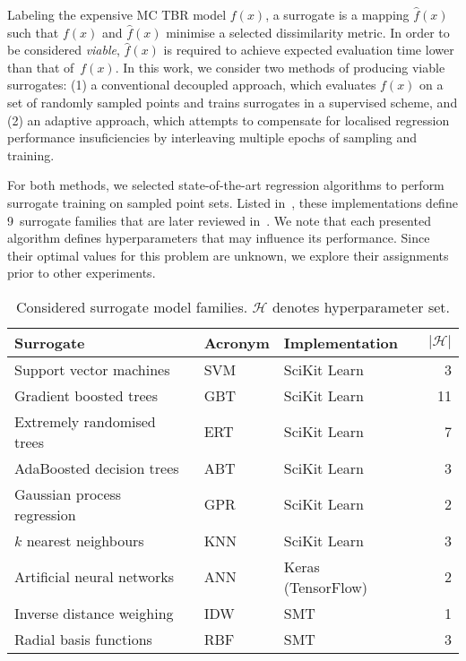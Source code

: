 Labeling the expensive MC TBR model $f(x)$, a surrogate is a mapping
$\hat{f}(x)$ such that $f(x)$ and $\hat{f}(x)$ minimise a selected dissimilarity
metric. In order to be considered \textit{viable}, $\hat{f}(x)$ is required to
achieve expected evaluation time lower than that of~$f(x)$. In this work, we
consider two methods of producing viable surrogates: (1) a conventional decoupled
approach, which evaluates $f(x)$ on a set of randomly sampled points and
trains surrogates in a supervised scheme, and (2) an adaptive approach, which attempts to
compensate for localised regression performance insuficiencies by interleaving
multiple epochs of sampling and training.

For both methods, we selected state-of-the-art regression algorithms to perform
surrogate training on sampled point sets. Listed in~, these
implementations define 9~surrogate families that are later reviewed in~.
We note that each presented algorithm defines hyperparameters that may influence its
performance. Since their optimal values for this problem are unknown, we explore
their assignments prior to other experiments.

\begin{table}[h]
	\caption{\label{tbl:surrogates}Considered surrogate model families.
	$\mathcal{H}$ denotes hyperparameter set.}
	\begin{indented}
	\item[]
		\begin{tabular}{lllr}
		\toprule
		Surrogate & Acronym & Implementation & $|\mathcal{H}|$ \\
		\midrule
		Support vector machines~\cite{fan2008liblinear}	& SVM & SciKit Learn~\cite{scikit-learn} & 3 \\
		Gradient boosted trees~\cite{friedman2001greedy,friedman1999stochastic,hastie2009elements}	& GBT & SciKit Learn & 11 \\
		Extremely randomised trees~\cite{geurts2006extremely}	& ERT & SciKit Learn & 7 \\
		AdaBoosted decision trees~\cite{drucker1997improving}	& ABT & SciKit Learn & 3 \\
		Gaussian process regression~\cite{williams2006gaussian}	& GPR & SciKit Learn & 2 \\
		$k$ nearest neighbours	& KNN & SciKit Learn & 3 \\
		Artificial neural networks	& ANN & Keras (TensorFlow)~\cite{chollet2015keras} & 2 \\
		Inverse distance weighing~\cite{shepard1968two} & IDW & SMT~\cite{SMT2019} & 1 \\
		Radial basis functions & RBF & SMT & 3 \\
		\bottomrule
		\end{tabular}
	\end{indented}
\end{table}


